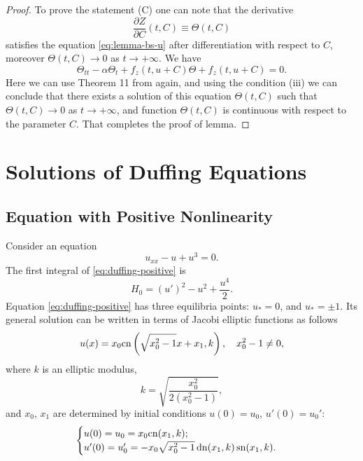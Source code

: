 \begin{proof}
	To prove the statement (C) one can note that the derivative
	\begin{equation}
		\dfrac{\partial Z}{\partial C}(t, C) \equiv \Theta(t, C)
	\end{equation}
	satisfies the equation \eqref{eq:lemma-bs-u} after differentiation with respect to $C$, moreover $\Theta(t, C) \to 0$ as $t \to +\infty$.
	We have
	\begin{equation}
		\Theta_{tt} - \alpha \Theta_t + f_z(t, u + C) \Theta + f_z(t, u + C) = 0.
	\end{equation}
	Here we can use Theorem 11 from \cite[Chapter 3]{Coppel} again, and using the condition (iii) we can conclude that there exists a solution of this equation $\Theta(t, C)$ such that $\Theta(t, C) \to 0$ as $t \to +\infty$, and function $\Theta(t, C)$ is continuous with respect to the parameter $C$.
	That completes the proof of lemma.
\end{proof}

\chapter{Solutions of Duffing Equations}
\label{appendix:solutions-of-duffing-equations}

\section{Equation with Positive Nonlinearity}

Consider an equation
\begin{equation}
	u_{xx} - u + u^3 = 0.
\label{eq:duffing-positive}
\end{equation}
The first integral of \eqref{eq:duffing-positive} is
\begin{equation}
	H_0 = (u')^2 - u^2 + \frac{u^4}{2}.
\end{equation}
Equation \eqref{eq:duffing-positive} has three equilibria points: $u_* = 0$, and $u_* = \pm 1$.
Its general solution can be written in terms of Jacobi elliptic functions as follows
\begin{equation}
	u(x) = x_0 \mathrm{cn} \left( \sqrt{x_0^2 - 1} x + x_1, k \right), \quad x_0^2 - 1 \neq 0,
\label{eq:duffing-positive-solution}
\end{equation}
where $k$ is an elliptic modulus,
\begin{equation}
	k = \sqrt{\frac{x_0^2}{2(x_0^2 - 1)}},
\end{equation}
and $x_0$, $x_1$ are determined by initial conditions $u(0) = u_0$, $u'(0) = u_0'$:
\begin{equation}
\begin{cases}
	u(0) = u_0 = x_0 \mathrm{cn} (x_1, k); \\
	u'(0) = u_0' = -x_0 \sqrt{x_0^2 - 1} \mathop\mathrm{dn} (x_1, k) \mathop\mathrm{sn} (x_1, k).
\end{cases}
\end{equation}

